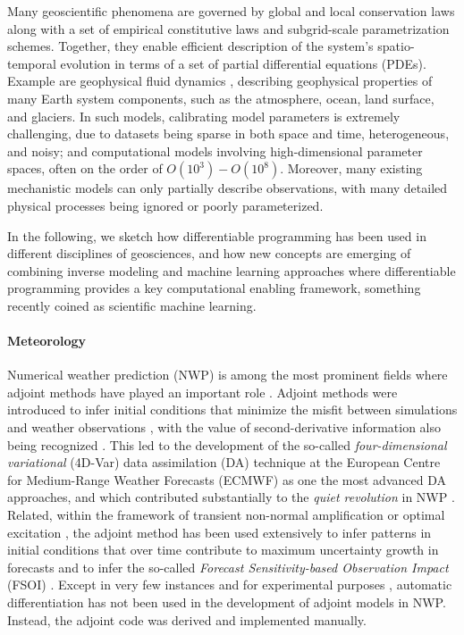 Many geoscientific phenomena are governed by global and local conservation laws along with a set of empirical constitutive laws and subgrid-scale parametrization schemes. 
Together, they enable efficient description of the system's spatio-temporal evolution in terms of a set of partial differential equations (PDEs).
Example are geophysical fluid dynamics \cite{Vallis:2016kv}, describing geophysical properties of many Earth system components, such as the atmosphere, ocean, land surface, and glaciers.
In such models, calibrating model parameters is extremely challenging, due to datasets being sparse in both space and time, heterogeneous, and noisy; and computational models involving high-dimensional parameter spaces, often on the order of $O(10^3) - O(10^8)$.
Moreover, many existing mechanistic models can only partially describe observations, with many detailed physical processes being ignored or poorly parameterized. 

In the following, we sketch how differentiable programming has been used in different disciplines of geosciences, and how new concepts are emerging of combining inverse modeling and machine learning approaches where differentiable programming provides a key computational enabling framework, something recently coined as scientific machine learning. 

\paragraph{Meteorology}

Numerical weather prediction (NWP) is among the most prominent fields where adjoint methods have played an important role \cite{Errico_1997}. 
Adjoint methods were introduced to infer initial conditions that minimize the misfit between simulations and weather observations \cite{Talagrand.1987,Courtier.1987}, with the value of second-derivative information also being recognized \cite{Dimet.2002}. 
This led to the development of the so-called \textit{four-dimensional variational} (4D-Var) data assimilation (DA) technique \cite{Rabier.1992,Rabier:2000uu} at the European Centre for Medium-Range Weather Forecasts (ECMWF) as one the most advanced DA approaches, and which contributed substantially to the \textit{quiet revolution} in NWP \cite{Bauer.2015}.
Related, within the framework of transient non-normal amplification or optimal excitation \cite{Farrell.1988,Farrell:1996jx}, the adjoint method has been used extensively to infer patterns in initial conditions that over time contribute to maximum uncertainty growth in forecasts \cite{Palmer:1994br,Buizza:1995in} and to infer the so-called \textit{Forecast Sensitivity-based Observation Impact} (FSOI) \cite{Langland:2004jo}.
Except in very few instances and for experimental purposes \cite{Giering.2006}, automatic differentiation has not been used in the development of adjoint models in NWP.
Instead, the adjoint code was derived and implemented manually.

